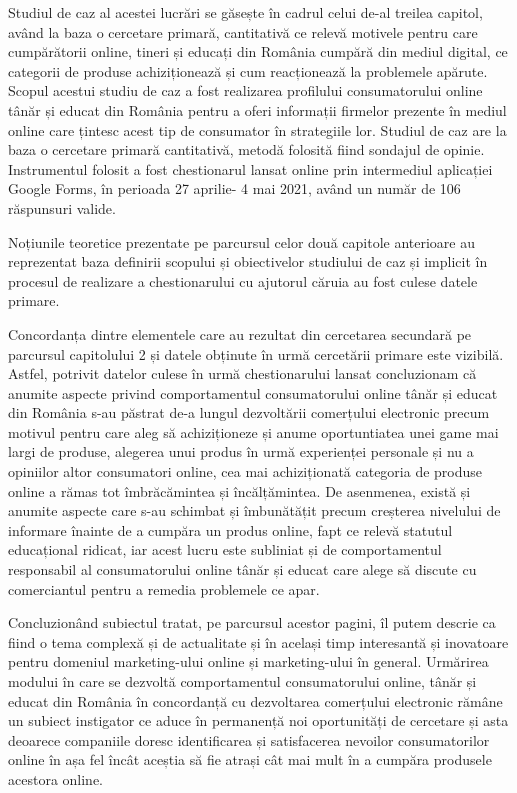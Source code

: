 \documentclass[a4paper, 12pt]{article}
\begin{document}
	\quad Studiul de caz al acestei lucrări se găsește în cadrul celui de-al treilea capitol, având la baza o cercetare primară, cantitativă ce relevă motivele pentru care cumpărătorii online, tineri și educați din România cumpără din mediul digital, ce categorii de produse achiziționează și cum reacționează la problemele apărute. Scopul acestui studiu de caz a fost realizarea profilului consumatorului online tânăr și educat din România pentru a oferi informații firmelor prezente în mediul online care țintesc acest tip de consumator în strategiile lor. Studiul de caz are la baza o cercetare primară cantitativă, metodă folosită fiind sondajul de opinie. Instrumentul folosit a fost chestionarul lansat online prin intermediul aplicației Google Forms, în perioada 27 aprilie- 4 mai 2021, având un număr de 106 răspunsuri valide.
	
	\quad  Noțiunile teoretice prezentate pe parcursul celor două capitole anterioare au reprezentat baza definirii scopului și obiectivelor studiului de caz și implicit în procesul de realizare a chestionarului cu ajutorul căruia au fost culese datele primare.
	
	\quad Concordanța dintre elementele care au rezultat din cercetarea secundară  pe parcursul capitolului 2 și datele obținute în urmă cercetării primare este vizibilă. Astfel, potrivit datelor culese în urmă chestionarului lansat concluzionam că anumite aspecte privind comportamentul consumatorului online tânăr și educat din România s-au păstrat de-a lungul dezvoltării comerțului electronic precum motivul pentru care aleg să achiziționeze și anume oportuntiatea unei game mai largi de produse, alegerea unui produs în urmă experienței personale și nu a opiniilor altor consumatori online, cea mai achiziționată categoria de produse online a rămas tot îmbrăcămintea și încălțămintea. De asenmenea, există și anumite aspecte care s-au schimbat și îmbunătățit precum creșterea nivelului de informare înainte de a cumpăra un produs online, fapt ce relevă statutul educațional ridicat, iar acest lucru este subliniat și de comportamentul responsabil al consumatorului online tânăr și educat care alege să discute cu comerciantul pentru a remedia problemele ce apar.
	
	\quad Concluzionând subiectul tratat, pe parcursul acestor pagini, îl putem descrie ca fiind o tema complexă și de actualitate și în același timp interesantă și inovatoare pentru domeniul marketing-ului online și marketing-ului în general. Urmărirea modului în care se dezvoltă comportamentul consumatorului online, tânăr și educat din România în concordanță cu dezvoltarea comerțului electronic rămâne un subiect instigator ce aduce în permanență noi oportunități de cercetare și asta deoarece companiile doresc identificarea și satisfacerea nevoilor consumatorilor online în așa fel încât aceștia să fie atrași cât mai mult în a cumpăra produsele acestora online.
	\newpage
	
\end{document}
